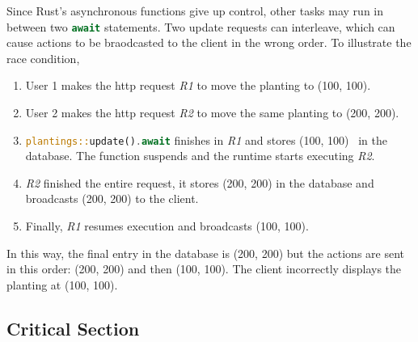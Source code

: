 \documentclass[final,oneside]{vutinfth}
\newcommand{\rustsnippet}[1]{\lstinline[language=rust]{#1}}
\begin{document}
Since Rust's asynchronous functions give up control, other tasks may run in between two \rustsnippet{await} statements.
Two update requests can interleave, which can cause actions to be braodcasted to the client in the wrong order.
To illustrate the race condition,
\begin{enumerate}
    \item User 1 makes the \gls{http} request \textit{R1} to move the planting to (100, 100).
    \item User 2 makes the \gls{http} request \textit{R2} to move the same planting to (200, 200).
    \item \rustsnippet{plantings::update().await} finishes in \textit{R1} and stores (100, 100) \
    in the database. The function suspends and the runtime starts executing \textit{R2}.
    \item \textit{R2} finished the entire request, it stores (200, 200) in the database and broadcasts (200, 200) to the client.
    \item Finally, \textit{R1} resumes execution and broadcasts (100, 100).
\end{enumerate}

In this way, the final entry in the database is (200, 200) but the actions are sent in this order: (200, 200) and then (100, 100).
The client incorrectly displays the planting at (100, 100).

\subsection{Critical Section}
\end{document}
